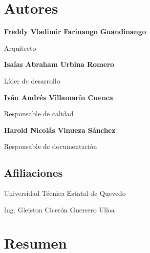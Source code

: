 \documentclass[12pt,a4paper]{article}
\begin{document}
\newpage

\section{Autores}

\vspace{0.4cm}

\begin{tcolorbox}

\textbf{Freddy Vladimir Farinango Guandinango}

Arquitecto

\vspace{0.4cm}

\textbf{Isaías Abraham Urbina Romero}

Líder de desarrollo

\vspace{0.4cm}

\textbf{Iván Andrés Villamarín Cuenca}

Responsable de calidad

\vspace{0.4cm}

\textbf{Harold Nicolás Vinueza Sánchez}

Responsable de documentación

\end{tcolorbox}

\vspace{0.5cm}

\subsection*{Afiliaciones}

Universidad Técnica Estatal de Quevedo

Ing. Gleiston Cicerón Guerrero Ulloa



\newpage

\tableofcontents

\newpage



\section{Resumen}
\end{document}
